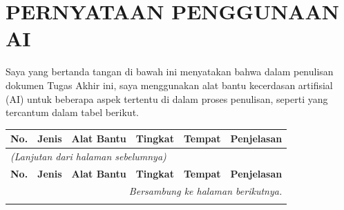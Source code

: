 \chapter*{PERNYATAAN PENGGUNAAN AI}
Saya yang bertanda tangan di bawah ini menyatakan bahwa dalam penulisan dokumen Tugas Akhir ini,
saya menggunakan alat bantu kecerdasan artifisial (AI) untuk beberapa aspek tertentu di dalam proses penulisan,
seperti yang tercantum dalam tabel berikut.

\footnotesize
\begin{longtable}{|p{0.4cm}| p{2.2cm} | p{2.2cm} | p{1.1cm} | p{1.6cm} | >{\raggedright\arraybackslash}p{5.8cm}| }
\hline
\textbf{No.} & \textbf{Jenis} & \textbf{Alat Bantu} & \textbf{Tingkat} & \textbf{Tempat} & \textbf{Penjelasan}\\
\hline
\endfirsthead

\multicolumn{6}{l}{\textit{(Lanjutan dari halaman sebelumnya)}} \\
\hline
\textbf{No.} & \textbf{Jenis} & \textbf{Alat Bantu} & \textbf{Tingkat} & \textbf{Tempat} & \textbf{Penjelasan}\\
\hline
\endhead

\hline
\multicolumn{6}{r}{\textit{Bersambung ke halaman berikutnya.}} \\
\endfoot

\hline
\endlastfoot


\end{longtable}

